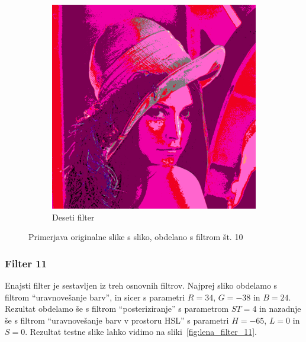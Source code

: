 \documentclass[a4paper, 12pt]{book}
\begin{document}
\begin{figure}[!ht]
\begin{subfigure}[b]{0.4\textwidth}
        \includegraphics[width=\textwidth]{lena_filter_10}
        \caption{Deseti filter}
    \end{subfigure}
    \caption{Primerjava originalne slike s sliko, obdelano s filtrom št. 10}
    \label{fig:lena_filter_10}
\end{figure}


\subsubsection*{Filter 11}
Enajsti filter je sestavljen iz treh osnovnih filtrov. Najprej sliko obdelamo s
filtrom ``uravnovešanje barv'', in sicer s parametri $R = 34$, $G = -38$ in
$B = 24$. Rezultat obdelamo še s filtrom ``posteriziranje'' s parametrom
$ST= 4$ in nazadnje še s filtrom ``uravnovešanje barv v prostoru HSL'' s
parametri $H = -65$, $L = 0$ in $S = 0$. Rezultat testne slike lahko
vidimo na sliki~\ref{fig:lena_filter_11}.
\end{document}
